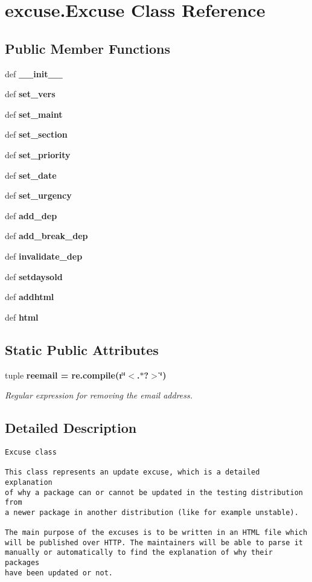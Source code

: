 \section{excuse.Excuse Class Reference}
\label{classexcuse_1_1Excuse}
\subsection*{Public Member Functions}
\begin{CompactItemize}
\item 
def \bf{\_\-\_\-init\_\-\_\-}
\item 
def \bf{set\_\-vers}
\item 
def \bf{set\_\-maint}
\item 
def \bf{set\_\-section}
\item 
def \bf{set\_\-priority}
\item 
def \bf{set\_\-date}
\item 
def \bf{set\_\-urgency}
\item 
def \bf{add\_\-dep}
\item 
def \bf{add\_\-break\_\-dep}
\item 
def \bf{invalidate\_\-dep}
\item 
def \bf{setdaysold}
\item 
def \bf{addhtml}
\item 
def \bf{html}
\end{CompactItemize}
\subsection*{Static Public Attributes}
\begin{CompactItemize}
\item 
tuple \bf{reemail} = re.compile(r\char`\"{}$<$.$\ast$?$>$\char`\"{})\label{classexcuse_1_1Excuse_bb15f55eed8f034db8a64b4ddc46460d}

\begin{CompactList}\small\item\em Regular expression for removing the email address. \item\end{CompactList}\end{CompactItemize}


\subsection{Detailed Description}


\footnotesize\begin{verbatim}Excuse class

This class represents an update excuse, which is a detailed explanation
of why a package can or cannot be updated in the testing distribution from
a newer package in another distribution (like for example unstable).

The main purpose of the excuses is to be written in an HTML file which
will be published over HTTP. The maintainers will be able to parse it
manually or automatically to find the explanation of why their packages
have been updated or not.
\end{verbatim}
\normalsize
 



